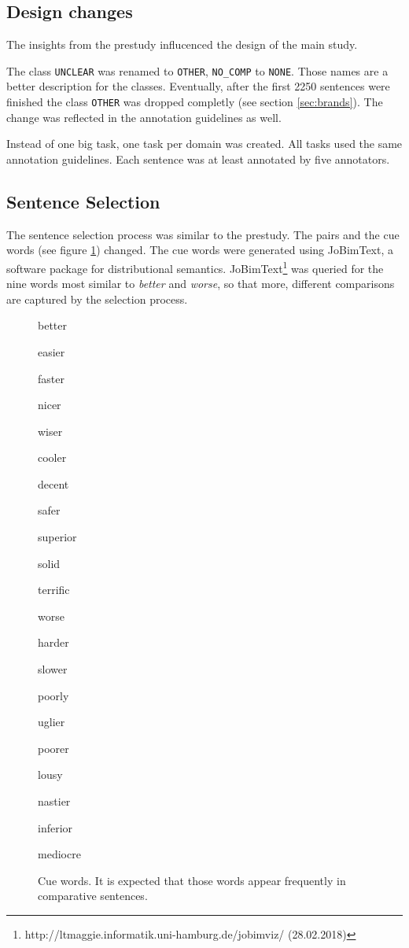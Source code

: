 \subsection{Design changes}
\label{sec:designchanges}
The insights from the prestudy influcenced the design of the main study.

The class \texttt{UNCLEAR} was renamed to \texttt{OTHER}, \texttt{NO\_COMP} to \texttt{NONE}. Those names are a better description for the classes. Eventually, after the first 2250 sentences were finished the class \texttt{OTHER} was dropped completly (see section \ref{sec:brands}). The change was reflected in the annotation guidelines as well. 

Instead of one big task, one task per domain was created. All tasks used the same annotation guidelines. Each sentence was at least annotated by five annotators.


\subsection{Sentence Selection}
The sentence selection process was similar to the prestudy. The pairs and the cue words (see figure \ref{fig:cue_words}) changed. The cue words were generated using JoBimText, a software package for distributional semantics. JoBimText\footnote{http://ltmaggie.informatik.uni-hamburg.de/jobimviz/ (28.02.2018)} was queried for the nine words most similar to \emph{better} and \emph{worse}, so that more, different comparisons are captured by the selection process.

\begin{figure}[h]
\centering
\caption{Cue words. It is expected that those words appear frequently in comparative sentences.}
\label{fig:cue_words}
\begin{multicols}{4}
better

easier

faster

nicer

wiser

cooler

decent

safer

superior

solid

terrific

worse

harder

slower

poorly

uglier

poorer

lousy

nastier

inferior

mediocre
\end{multicols}
\end{figure}

